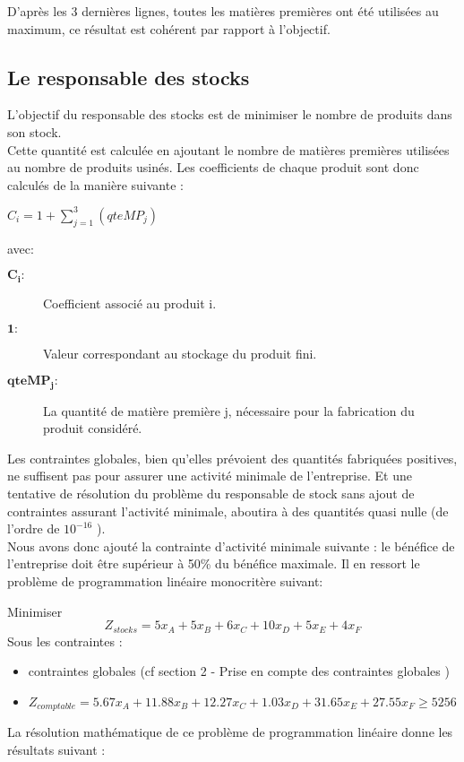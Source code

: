 \documentclass[12pt]{article}
\begin{document}
D’après les 3 dernières lignes, toutes les matières premières ont été utilisées au maximum, ce résultat est cohérent par rapport à l'objectif.

\subsection{Le responsable des stocks}
L'objectif du responsable des stocks est de minimiser le nombre de produits dans son stock. \\
Cette quantité est calculée en ajoutant le nombre de matières premières utilisées au nombre de produits usinés. Les coefficients de chaque produit sont donc calculés de la manière suivante : 
\begin{center} $ C_{i} = 1 +  \sum_{j=1}^{3}(qteMP_{j}) $ \end{center} avec:
\begin{description}
\item[$\mathbf{C_{i} :}$] Coefficient associé au produit i.
\item[$\mathbf{1} :$] Valeur correspondant au stockage du produit fini.
\item[$\mathbf{qteMP_{j} :}$] La quantité de matière première j, nécessaire pour la fabrication du produit considéré.
\end{description}
Les contraintes globales, bien qu'elles prévoient des quantités fabriquées positives, ne suffisent pas pour assurer une activité minimale de l'entreprise. Et une tentative de résolution du problème du responsable de stock sans ajout de contraintes assurant l'activité minimale, aboutira à des quantités quasi nulle (de l'ordre de $ 10 ^{-16}$ ).\\
Nous avons donc ajouté la contrainte d'activité minimale suivante : le bénéfice de l'entreprise doit être supérieur à 50\% du bénéfice maximale. 
Il en ressort le problème de programmation linéaire monocritère suivant:
\begin{tcolorbox}
Minimiser \\
\begin{equation*}
 Z_{stocks}= 5x_{A} + 5x_{B} + 6x_{C} + 10x_{D} + 5x_{E} + 4x_{F}
\end{equation*}
Sous les contraintes :
\begin{itemize}
\item contraintes globales (cf section 2 - Prise en compte des contraintes globales )
\item $Z_{comptable}= 5.67x_{A} +11.88x_{B} +12.27x_{C} +1.03x_{D} +31.65x_{E} +27.55x_{F} \geq 5256$
\end{itemize}
\end{tcolorbox}
La résolution mathématique de ce problème de programmation linéaire donne les résultats suivant :\\
\end{document}
